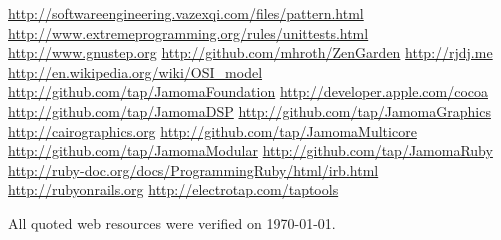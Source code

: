 \documentclass[twoside,10pt]{article}
\begin{document}











\renewcommand{\refname}{Web Resources}
\begin{thebibliography}{99}
	\footnotesize
{}    \url{http://softwareengineering.vazexqi.com/files/pattern.html}
    \url{http://www.extremeprogramming.org/rules/unittests.html}
    \url{http://www.gnustep.org} 
    \url{http://github.com/mhroth/ZenGarden}  
    \url{http://rjdj.me} 
    \url{http://en.wikipedia.org/wiki/OSI_model}
    \url{http://github.com/tap/JamomaFoundation}     
    \url{http://developer.apple.com/cocoa}    
 	  \url{http://github.com/tap/JamomaDSP}
  \url{http://github.com/tap/JamomaGraphics} 
  \url{http://cairographics.org}
  \url{http://github.com/tap/JamomaMulticore}
  \url{http://github.com/tap/JamomaModular}
  \url{http://github.com/tap/JamomaRuby}
  \url{http://ruby-doc.org/docs/ProgrammingRuby/html/irb.html}
  \url{http://rubyonrails.org}   
	\url{http://electrotap.com/taptools}
\end{thebibliography} 
All quoted web resources were verified on \today.
\end{document}
